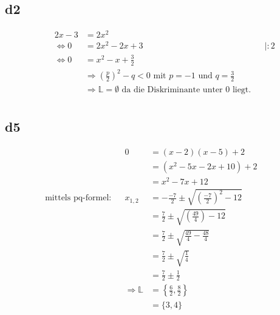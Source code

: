 \documentclass[]{article}
\newcommand{\eq}{\Leftrightarrow}
\newcommand{\rarr}{\Rightarrow}
\begin{document}
\subsection*{d2}
\begin{align*}
	&& 2x-3 &= 2x^2 && \\
	&&\eq 0 &= 2x^2 -2x +3 && |:2\\
	&&\eq 0 &= x^2 -x +\frac{3}{2} &&\\
	&& &\rarr \left(\frac{p}{2}\right)^2 - q < 0 \text{ mit } p=-1 \text{ und } q = \frac{3}{2} &&\\
	&& &\rarr \mathbb{L} = \emptyset  \text{ da die Diskriminante unter $0$ liegt.}&&\\
\end{align*}
\subsection*{d5}
\begin{align*}
	&& 0 &= (x-2)(x-5)+2 && \\
	&& &= (x^2-5x-2x+10)+2 && \\
	&& &= x^2-7x+12 && \\
	\text{mittels pq-formel:}&& x_{1,2} &= -\frac{-7}{2} \pm \sqrt{\left(\frac{-7}{2}\right)^2 - 12} &&\\
	&& &= \frac{7}{2} \pm \sqrt{\left(\frac{49}{4}\right) - 12} &&\\
	&& &= \frac{7}{2} \pm \sqrt{\frac{49}{4} - \frac{48}{4}} &&\\
	&& &= \frac{7}{2} \pm \sqrt{\frac{1}{4}} &&\\
	&& &= \frac{7}{2} \pm \frac{1}{2} &&\\
	&& \rarr \mathbb{L} &= \left\{\frac{6}{2}, \frac{8}{2}\right\} &&\\
	&& &= \{3, 4\} &&\\
\end{align*}
\end{document}
